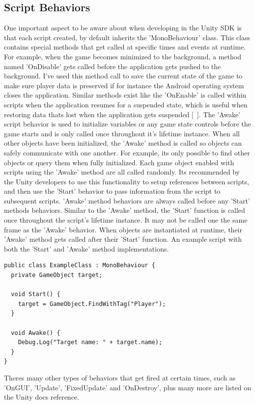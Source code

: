 \subsection{Script Behaviors}
One important aspect to be aware about when developing in the Unity SDK is that each script created, by default inherits the 'MonoBehaviour' class. This class contains special methods that get called at specific times and events at runtime. For example, when the game becomes minimized to the background, a method named 'OnDisable' gets called before the application gets pushed to the background. I've used this method call to save the current state of the game to make sure player data is preserved if for instance the Android operating system closes the application. Similar methods exist like the 'OnEnable' is called within scripts when the application resumes for a suspended state, which is useful when restoring data thats lost when the application gets suspended [~\cite{Script-Behaviours}].
The 'Awake' script behavior is used to initialize variables or any game state controls before the game starts and is only called once throughout it's lifetime instance. When all other objects have been initialized, the 'Awake' method is called so objects can safely communicate with one another. For example, its only possible to find other objects or query them when fully initialized. Each game object enabled with scripts using the 'Awake' method are all called randomly. Its recommended by the Unity developers to use this functionality to setup references between scripts, and then use the 'Start' behavior to pass information from the script to subsequent scripts. 'Awake' method behaviors are always called before any 'Start' methods behaviors. Similar to the 'Awake' method, the 'Start' function is called once throughout the script's lifetime instance. It may not be called one the same frame as the 'Awake' behavior. When objects are instantiated at runtime, their 'Awake' method gets called after their 'Start' function. An example script with both the 'Start' and 'Awake' method implementations.

\begin{verbatim}
public class ExampleClass : MonoBehaviour {
  private GameObject target;
  
  void Start() {
    target = GameObject.FindWithTag("Player");
  }
  
  void Awake() {
    Debug.Log("Target name: " + target.name);
  }
}
\end{verbatim}

Theres many other types of behaviors that get fired at certain times, such as 'OnGUI', 'Update', 'FixedUpdate' and 'OnDestroy', plus many more are listed on the Unity docs reference.
